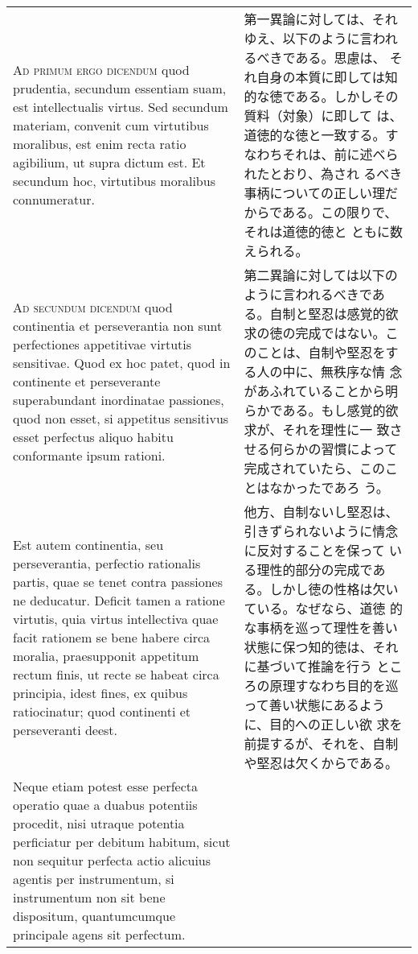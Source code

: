 \documentclass[10pt]{jsarticle}
\begin{document}
\begin{longtable}{p{21em}p{21em}}
\\


{\scshape Ad primum ergo dicendum} quod prudentia, secundum essentiam
suam, est intellectualis virtus. Sed secundum materiam, convenit cum
virtutibus moralibus, est enim recta ratio agibilium, ut supra dictum
est. Et secundum hoc, virtutibus moralibus connumeratur.

&

第一異論に対しては、それゆえ、以下のように言われるべきである。思慮は、
それ自身の本質に即しては知的な徳である。しかしその質料（対象）に即して
は、道徳的な徳と一致する。すなわちそれは、前に述べられたとおり、為され
るべき事柄についての正しい理だからである。この限りで、それは道徳的徳と
ともに数えられる。

\\


{\scshape Ad secundum dicendum} quod continentia et perseverantia non
sunt perfectiones appetitivae virtutis sensitivae. Quod ex hoc patet,
quod in continente et perseverante superabundant inordinatae
passiones, quod non esset, si appetitus sensitivus esset perfectus
aliquo habitu conformante ipsum rationi.

&

第二異論に対しては以下のように言われるべきである。自制と堅忍は感覚的欲
求の徳の完成ではない。このことは、自制や堅忍をする人の中に、無秩序な情
念があふれていることから明らかである。もし感覚的欲求が、それを理性に一
致させる何らかの習慣によって完成されていたら、このことはなかったであろ
う。


\\

Est autem continentia, seu perseverantia, perfectio rationalis partis,
quae se tenet contra passiones ne deducatur. Deficit tamen a ratione
virtutis, quia virtus intellectiva quae facit rationem se bene habere
circa moralia, praesupponit appetitum rectum finis, ut recte se habeat
circa principia, idest fines, ex quibus ratiocinatur; quod continenti
et perseveranti deest.

&

他方、自制ないし堅忍は、引きずられないように情念に反対することを保って
いる理性的部分の完成である。しかし徳の性格は欠いている。なぜなら、道徳
的な事柄を巡って理性を善い状態に保つ知的徳は、それに基づいて推論を行う
ところの原理すなわち目的を巡って善い状態にあるように、目的への正しい欲
求を前提するが、それを、自制や堅忍は欠くからである。

\\


Neque etiam potest esse perfecta operatio quae a duabus potentiis
procedit, nisi utraque potentia perficiatur per debitum habitum, sicut
non sequitur perfecta actio alicuius agentis per instrumentum, si
instrumentum non sit bene dispositum, quantumcumque principale agens
sit perfectum.


\end{longtable}
\end{document}
